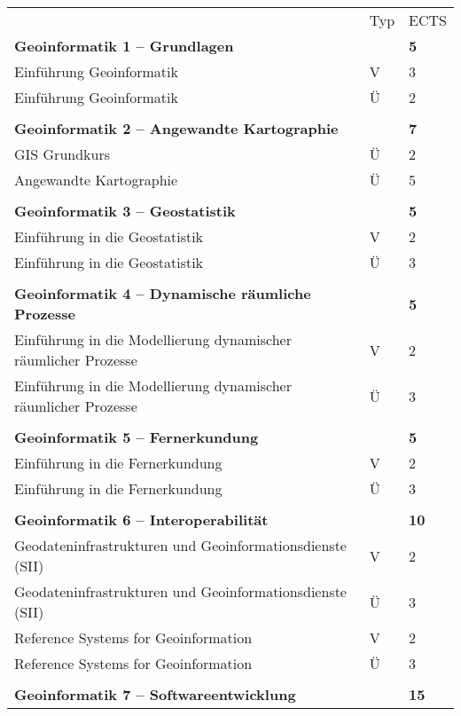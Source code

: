 
\begin{longtable}{p{} p{} p{}}
 & Typ & ECTS \\
\textbf{Geoinformatik 1 -- Grundlagen} & & \textbf{5}\\
Einführung Geoinformatik & V & 3\\
Einführung Geoinformatik & Ü & 2\\
& &\\
\textbf{Geoinformatik 2 -- Angewandte Kartographie} & & \textbf{7}\\
GIS Grundkurs & Ü & 2\\
Angewandte Kartographie & Ü & 5\\
& &\\
\textbf{Geoinformatik 3 -- Geostatistik} & & \textbf{5}\\
Einführung in die Geostatistik & V & 2\\
Einführung in die Geostatistik & Ü & 3\\
&&\\
\textbf{Geoinformatik 4 -- Dynamische räumliche Prozesse} & &\textbf{5}\\
Einführung in die Modellierung dynamischer räumlicher Prozesse & V & 2 \\
Einführung in die Modellierung dynamischer räumlicher Prozesse & Ü & 3\\
&&\\
\textbf{Geoinformatik 5 -- Fernerkundung} && \textbf{5}\\
Einführung in die Fernerkundung & V & 2\\
Einführung in die Fernerkundung & Ü & 3\\
&&\\
\textbf{Geoinformatik 6 -- Interoperabilität}&& \textbf{10}\\
Geodateninfrastrukturen und Geoinformationsdienste (SII) & V & 2\\
Geodateninfrastrukturen und Geoinformationsdienste (SII) & Ü & 3\\
Reference Systems for Geoinformation & V & 2\\
Reference Systems for Geoinformation & Ü & 3\\
&&\\
\textbf{Geoinformatik 7 -- Softwareentwicklung}&& \textbf{15}\\

\end{longtable}
